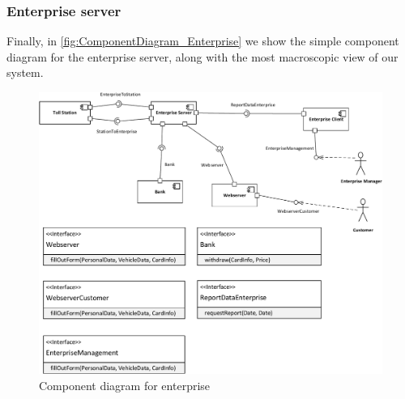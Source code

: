 \subsubsection*{Enterprise server}
Finally, in \autoref{fig:ComponentDiagram_Enterprise} we show the simple component diagram for the enterprise server, along with the most macroscopic view of our system. 
\begin{figure}
\centering
\includegraphics[width=1\textwidth]{img/component_diagrams/ComponentDiagram_Enterprise}
\caption{Component diagram for enterprise}
\label{fig:ComponentDiagram_Enterprise}
\end{figure}
